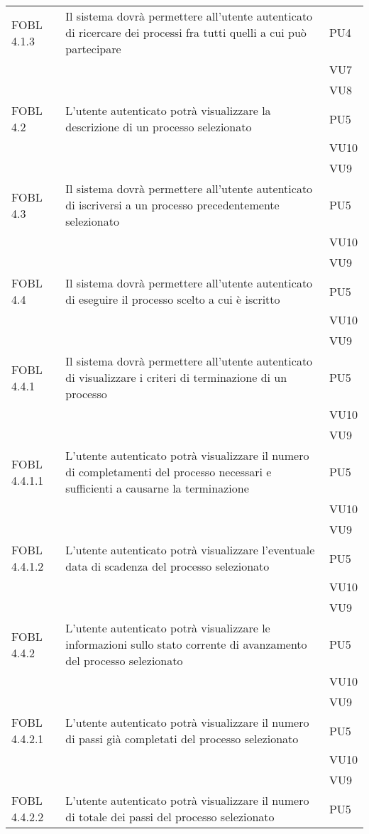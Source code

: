 \begin{longtable}{lXp{}}
\midrule 
FOBL 4.1.3&Il sistema dovrà permettere all'utente autenticato di ricercare dei processi fra tutti quelli a cui può partecipare&PU4\\ 
&&VU7\\ 
&&VU8\\ 
\midrule 
FOBL 4.2&L'utente autenticato potrà visualizzare la descrizione di un processo selezionato&PU5\\ 
&&VU10\\ 
&&VU9\\ 
\midrule 
FOBL 4.3&Il sistema dovrà permettere all'utente autenticato di iscriversi a un processo precedentemente selezionato&PU5\\ 
&&VU10\\ 
&&VU9\\ 
\midrule 
FOBL 4.4&Il sistema dovrà permettere all'utente autenticato di eseguire il processo scelto a cui è iscritto&PU5\\ 
&&VU10\\ 
&&VU9\\ 
\midrule 
FOBL 4.4.1&Il sistema dovrà permettere all'utente autenticato di visualizzare i criteri di terminazione di un processo&PU5\\ 
&&VU10\\ 
&&VU9\\ 
\midrule 
FOBL 4.4.1.1&L'utente autenticato potrà visualizzare il numero di completamenti del processo necessari e sufficienti a causarne la terminazione&PU5\\ 
&&VU10\\ 
&&VU9\\ 
\midrule 
FOBL 4.4.1.2&L'utente autenticato potrà visualizzare l'eventuale data di scadenza del processo selezionato&PU5\\ 
&&VU10\\ 
&&VU9\\ 
\midrule 
FOBL 4.4.2&L'utente autenticato potrà visualizzare le informazioni sullo stato corrente di avanzamento del processo selezionato&PU5\\ 
&&VU10\\ 
&&VU9\\ 
\midrule 
FOBL 4.4.2.1&L'utente autenticato potrà visualizzare il numero di passi già completati del processo selezionato&PU5\\
&&VU10\\ 
&&VU9\\ 
\midrule 
FOBL 4.4.2.2&L'utente autenticato potrà visualizzare il numero di totale dei passi del processo selezionato&PU5\\ 

\end{longtable}
